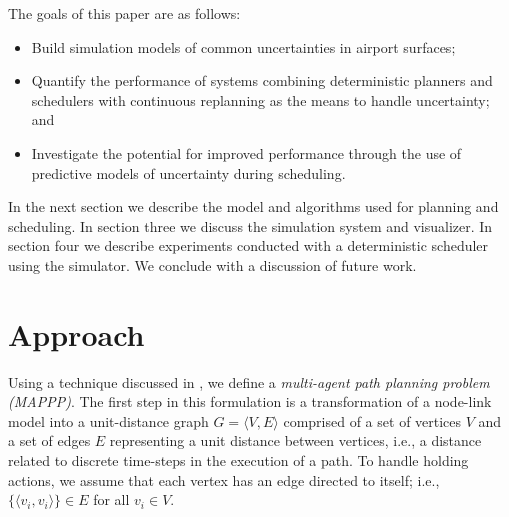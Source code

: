 \documentclass[letterpaper, 10 pt, conference]{ieeeconf}
\begin{document}

The goals of this paper are as follows:
\begin{itemize}
\item Build simulation models of common uncertainties in airport surfaces;
\item Quantify the performance of systems combining deterministic planners and schedulers with continuous replanning as the means to handle uncertainty; and
\item Investigate the potential for improved performance through the use of predictive models of uncertainty during scheduling.
\end{itemize}
In the next section we describe the model and algorithms used for planning and scheduling. In section three we discuss the simulation system and visualizer. In section four we describe experiments conducted with a deterministic scheduler using the simulator. We conclude with a discussion of future work.
\section{Approach}

Using a technique discussed in \cite{flow}, we define a {\em multi-agent path planning problem (MAPPP)}. The first step in this formulation is a transformation of a node-link model into a unit-distance graph $G = \langle V, E \rangle$ comprised of a set of vertices $V$ and a set of edges $E$ representing a unit distance between vertices, i.e., a distance related to discrete time-steps in the execution of a path. To handle holding actions, we assume that each vertex has an edge directed to itself; i.e., $\{ \langle v_i, v_i \rangle \} \in E$ for all $v_i \in V$.
\end{document}

